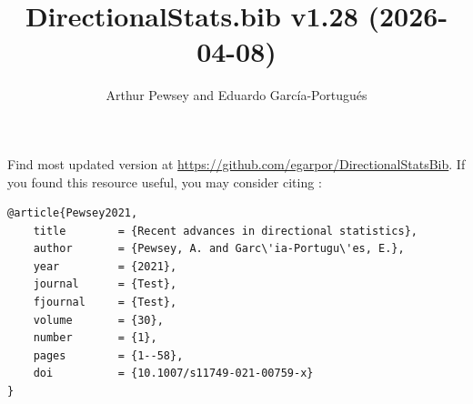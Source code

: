 \documentclass[10pt]{article}
\title{DirectionalStats.bib v1.28 (2026-04-08)}
\author{Arthur Pewsey and Eduardo García-Portugués}
\date{}
\begin{document}
\maketitle

Find most updated version at \url{https://github.com/egarpor/DirectionalStatsBib}. If you found this resource useful, you may consider citing \cite{Pewsey2021}:
\begin{verbatim}
@article{Pewsey2021,
    title        = {Recent advances in directional statistics},
    author       = {Pewsey, A. and Garc\'ia-Portugu\'es, E.},
    year         = {2021},
    journal      = {Test},
    fjournal     = {Test},
    volume       = {30},
    number       = {1},
    pages        = {1--58},
    doi          = {10.1007/s11749-021-00759-x}
}
\end{verbatim}

\nocite{*}

\setlength\bibsep{0cm}
\setlength\bibhang{0.25cm}



\end{document}
